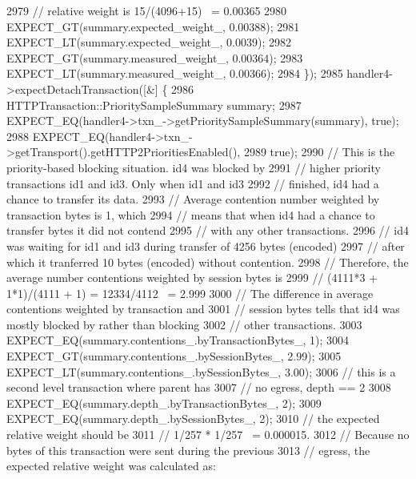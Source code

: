 \begin{DoxyCode}
2979       \textcolor{comment}{// relative weight is 15/(4096+15) ~= 0.00365}
2980       EXPECT\_GT(summary.expected_weight_, 0.00388);
2981       EXPECT\_LT(summary.expected_weight_, 0.0039);
2982       EXPECT\_GT(summary.measured_weight_, 0.00364);
2983       EXPECT\_LT(summary.measured_weight_, 0.00366);
2984     \});
2985   handler4->expectDetachTransaction([&] \{
2986       HTTPTransaction::PrioritySampleSummary summary;
2987       EXPECT\_EQ(handler4->txn\_->getPrioritySampleSummary(summary), \textcolor{keyword}{true});
2988       EXPECT\_EQ(handler4->txn\_->getTransport().getHTTP2PrioritiesEnabled(),
2989                 \textcolor{keyword}{true});
2990       \textcolor{comment}{// This is the priority-based blocking situation. id4 was blocked by}
2991       \textcolor{comment}{// higher priority transactions id1 and id3. Only when id1 and id3}
2992       \textcolor{comment}{// finished, id4 had a chance to transfer its data.}
2993       \textcolor{comment}{// Average contention number weighted by transaction bytes is 1, which}
2994       \textcolor{comment}{// means that when id4 had a chance to transfer bytes it did not contend}
2995       \textcolor{comment}{// with any other transactions.}
2996       \textcolor{comment}{// id4 was waiting for id1 and id3 during transfer of 4256 bytes (encoded)}
2997       \textcolor{comment}{// after which it tranferred 10 bytes (encoded) without contention.}
2998       \textcolor{comment}{// Therefore, the average number contentions weighted by session bytes is}
2999       \textcolor{comment}{// (4111*3 + 1*1)/(4111 + 1) = 12334/4112 ~= 2.999}
3000       \textcolor{comment}{// The difference in average contentions weighted by transaction and}
3001       \textcolor{comment}{// session bytes tells that id4 was mostly blocked by rather than blocking}
3002       \textcolor{comment}{// other transactions.}
3003       EXPECT\_EQ(summary.contentions_.byTransactionBytes_, 1);
3004       EXPECT\_GT(summary.contentions_.bySessionBytes_, 2.99);
3005       EXPECT\_LT(summary.contentions_.bySessionBytes_, 3.00);
3006       \textcolor{comment}{// this is a second level transaction where parent has}
3007       \textcolor{comment}{// no egress, depth == 2}
3008       EXPECT\_EQ(summary.depth_.byTransactionBytes_, 2);
3009       EXPECT\_EQ(summary.depth_.bySessionBytes_, 2);
3010       \textcolor{comment}{// the expected relative weight should be}
3011       \textcolor{comment}{// 1/257 * 1/257 ~= 0.000015.}
3012       \textcolor{comment}{// Because no bytes of this transaction were sent during the previous}
3013       \textcolor{comment}{// egress, the expected relative weight was calculated as:}

\end{DoxyCode}
